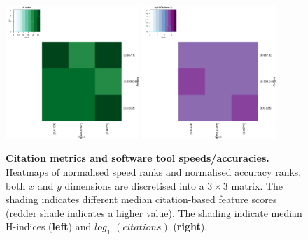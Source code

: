 \documentclass[fleqn,10pt]{SelfArx} %
\begin{document}



\begin{figure}[H]
\centering
\includegraphics[width=0.45\textwidth]{hindex-SpeedVsAccuracy-heatmap.pdf}
\includegraphics[width=0.45\textwidth]{cites-SpeedVsAccuracy-heatmap.pdf}
\caption{{\bf Citation metrics and software tool speeds/accuracies.} Heatmaps of normalised speed ranks and normalised accuracy
  ranks, both $x$ and $y$ dimensions are discretised into a $3 \times
  3$ matrix. The shading indicates different median citation-based
  feature scores (redder shade indicates a higher value).  The shading
  indicate median H-indices ({\bf left}) and $log_{10}(citations)$
  ({\bf right}). }
\label{fig:heatmaps}
\end{figure}
\end{document}

